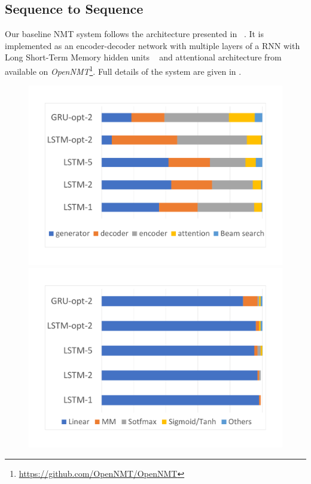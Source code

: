 \documentclass[11pt,a4paper]{article}
\begin{document}
\subsection{Sequence to Sequence}
\label{seq2seq}

Our baseline NMT system follows the architecture presented in ~. It is implemented as an encoder-decoder network with multiple layers of a RNN with Long Short-Term Memory hidden units ~\cite{DBLP:journals/corr/ZarembaSV14} and attentional architecture from ~ available on \textit{OpenNMT}\footnote{\url{https://github.com/OpenNMT/OpenNMT}}. Full details of the system are given in .

\begin{figure}
\includegraphics[width=\linewidth]{decoder.pdf}
\includegraphics[width=\linewidth]{decoder_linear.pdf}

\end{figure}
\end{document}
